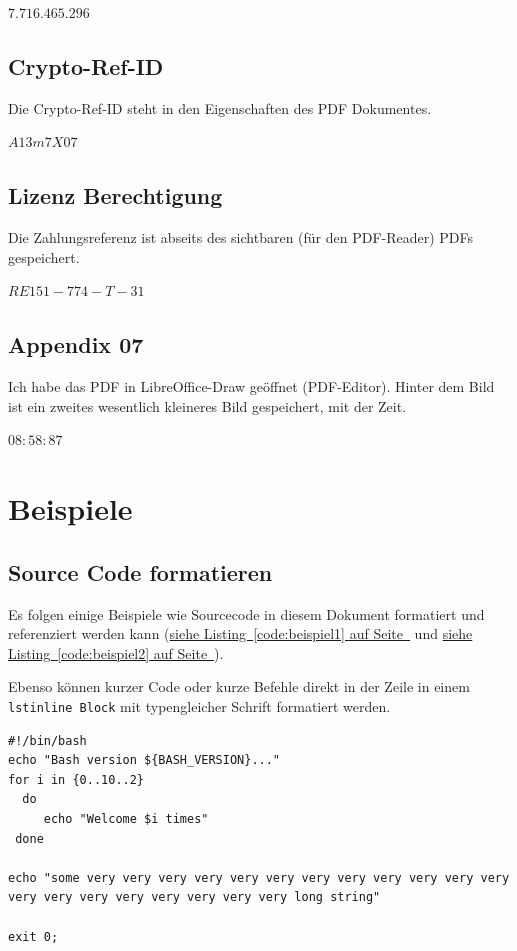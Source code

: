 \documentclass[12pt,a4paper,titlepage,oneside]{scrartcl}
\begin{document}
$7.716.465.296$

\subsection{Crypto-Ref-ID}
Die Crypto-Ref-ID steht in den Eigenschaften des PDF Dokumentes.

$A13m7X07$

\subsection{Lizenz Berechtigung}
Die Zahlungsreferenz ist abseits des sichtbaren (für den PDF-Reader) PDFs gespeichert.

$RE151-774-T-31$


\subsection{Appendix 07}
Ich habe das PDF in LibreOffice-Draw geöffnet (PDF-Editor).
Hinter dem Bild ist ein zweites wesentlich kleineres Bild gespeichert, mit der Zeit.

$08:58:87$


\section{Beispiele}

\subsection{Source Code formatieren}
Es folgen einige Beispiele wie Sourcecode in diesem Dokument formatiert und referenziert werden kann
(\hyperref[code:beispiel1]{siehe Listing~\ref*{code:beispiel1} auf Seite~\pageref*{code:beispiel1}} und \hyperref[code:beispiel2]{siehe Listing~\ref*{code:beispiel2} auf Seite~\pageref*{code:beispiel2}}).

Ebenso können kurzer Code oder kurze Befehle direkt in der Zeile in einem \lstinline{lstinline Block} mit typengleicher Schrift formatiert werden.



\begin{lstlisting}[caption=Example bash script,label=code:beispiel2,style=simple]
#!/bin/bash
echo "Bash version ${BASH_VERSION}..."
for i in {0..10..2}
  do
     echo "Welcome $i times"
 done

echo "some very very very very very very very very very very very very very very very very very very very very long string"

exit 0;
\end{lstlisting}
\end{document}
